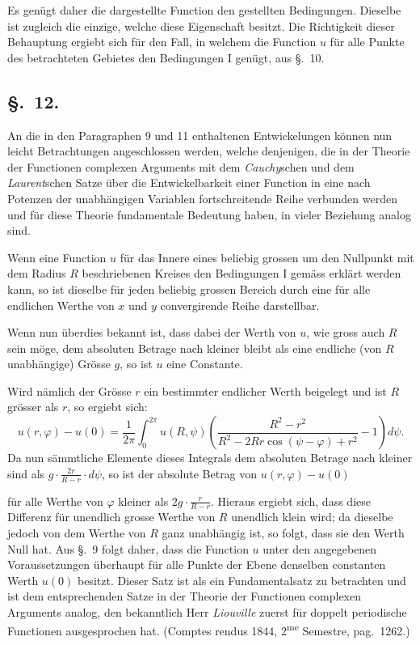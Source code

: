 \documentclass{article}
\begin{document}
Es genügt daher die dargestellte Function den gestellten Bedingungen. Dieselbe ist zugleich die einzige, welche diese Eigenschaft besitzt. Die Richtigkeit dieser Behauptung ergiebt sich für den Fall, in welchem die Function $u$ für alle Punkte des betrachteten Gebietes den Bedingungen I genügt, aus §.~10.

\subsection*{§.~12.}

An die in den Paragraphen 9 und 11 enthaltenen Entwickelungen können nun leicht Betrachtungen angeschlossen werden, welche denjenigen, die in der Theorie der Functionen complexen Arguments mit dem \emph{Cauchy}schen und dem \emph{Laurent}schen Satze über die Entwickelbarkeit einer Function in eine nach Potenzen der unabhängigen Variablen fortschreitende Reihe verbunden werden und für diese Theorie fundamentale Bedeutung haben, in vieler Beziehung analog sind.

Wenn eine Function $u$ für das Innere eines beliebig grossen um den Nullpunkt mit dem Radius $R$ beschriebenen Kreises den Bedingungen I gemäss erklärt werden kann, so ist dieselbe für jeden beliebig grossen Bereich durch eine für alle endlichen Werthe von $x$ und $y$ convergirende Reihe darstellbar.

Wenn nun überdies bekannt ist, dass dabei der Werth von $u$, wie gross auch $R$ sein möge, dem absoluten Betrage nach kleiner bleibt als eine endliche (von $R$ unabhängige) Grösse $g$, so ist $u$ eine Constante.

Wird nämlich der Grösse $r$ ein bestimmter endlicher Werth beigelegt und ist $R$ grösser als $r$, so ergiebt sich:
\[
u(r, \varphi) - u(0) = \frac{1}{2\pi} \int_0^{2\pi} u(R, \psi) \left(\frac{R^2 - r^2}{R^2 - 2Rr\cos(\psi - \varphi) + r^2} - 1\right) d\psi.
\]
Da nun sämmtliche Elemente dieses Integrals dem absoluten Betrage nach kleiner sind als $g \cdot \frac{2r}{R - r} \cdot d\psi$, so ist der absolute Betrag von $u(r, \varphi) - u(0)$

für alle Werthe von $\varphi$ kleiner als $2g \cdot \frac{r}{R - r}$. Hieraus ergiebt sich, dass diese Differenz für unendlich grosse Werthe von $R$ unendlich klein wird; da dieselbe jedoch von dem Werthe von $R$ ganz unabhängig ist, so folgt, dass sie den Werth Null hat. Aus §.~9 folgt daher, dass die Function $u$ unter den angegebenen Voraussetzungen überhaupt für alle Punkte der Ebene denselben constanten Werth $u(0)$ besitzt. Dieser Satz ist als ein Fundamentalsatz zu betrachten und ist dem entsprechenden Satze in der Theorie der Functionen complexen Arguments analog, den bekanntlich Herr \emph{Liouville} zuerst für doppelt periodische Functionen ausgesprochen hat. (Comptes rendus 1844, 2\textsuperscript{me} Semestre, pag.~1262.)
\end{document}
